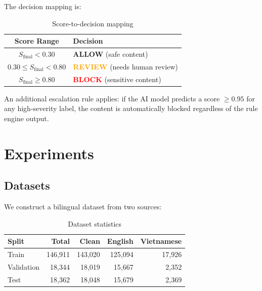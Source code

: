 \documentclass[12pt,a4paper]{article}
\begin{document}
The decision mapping is:

\begin{table}[htbp]
    \centering
    \caption{Score-to-decision mapping}
    \label{tab:decision}
    \begin{tabular}{@{}cl@{}}
        \toprule
        \textbf{Score Range} & \textbf{Decision} \\
        \midrule
        $S_{\text{final}} < 0.30$ & \textcolor{green!70!black}{\textbf{ALLOW}} (safe content) \\
        $0.30 \leq S_{\text{final}} < 0.80$ & \textcolor{orange}{\textbf{REVIEW}} (needs human review) \\
        $S_{\text{final}} \geq 0.80$ & \textcolor{red}{\textbf{BLOCK}} (sensitive content) \\
        \bottomrule
    \end{tabular}
\end{table}

An additional escalation rule applies: if the AI model predicts a score $\geq 0.95$ for any high-severity label, the content is automatically blocked regardless of the rule engine output.

\section{Experiments}
\label{sec:experiments}

\subsection{Datasets}

We construct a bilingual dataset from two sources:

\begin{table}[htbp]
    \centering
    \caption{Dataset statistics}
    \label{tab:dataset}
    \begin{tabular}{@{}lrrrr@{}}
        \toprule
        \textbf{Split} & \textbf{Total} & \textbf{Clean} & \textbf{English} & \textbf{Vietnamese} \\
        \midrule
        Train      & 146,911 & 143,020 & 125,094 & 17,926 \\
        Validation & 18,344  & 18,019  & 15,667  & 2,352  \\
        Test       & 18,362  & 18,048  & 15,679  & 2,369  \\
        \bottomrule
    \end{tabular}
\end{table}
\end{document}
